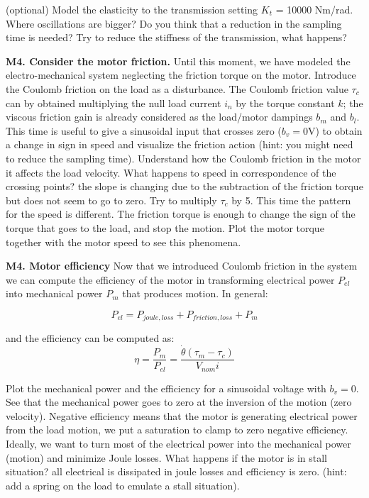 \documentclass[11pt]{article}
\begin{document}
(optional) Model the  elasticity to the transmission setting $K_t$ = 10000 Nm/rad. Where oscillations are bigger? Do you think that a reduction in the sampling time is needed? Try to reduce the stiffness of the transmission, what happens?
%
%
\par
\textbf{M4. Consider the motor friction.} 
Until this moment, we have modeled the electro-mechanical system neglecting the friction torque on the motor. 
Introduce the Coulomb friction on the load as a disturbance. 
The Coulomb friction value $\tau_c$ can by obtained multiplying the null load current $i_n$ by the torque constant $k$; the viscous friction gain is already considered as the load/motor dampings $b_m$ and $b_l$. This time is useful to give a sinusoidal input that crosses zero ($b_v = 0 \mathrm{V}$)
to obtain a  change in sign in speed  and visualize the friction action (hint: you might need to reduce the sampling time). Understand how the Coulomb friction in the motor it affects the load velocity. 
What happens to speed in correspondence of the crossing points? the slope  is 
changing due to the subtraction of the friction torque but does not seem to go to zero. 
Try to multiply $\tau_c$ by 5. This time the pattern for the speed is different. 
The friction torque is enough to change the sign of the torque that goes to the load, 
and stop the motion. Plot the motor torque together with the motor speed to see this phenomena.


\textbf{M4. Motor efficiency}
Now that we introduced Coulomb friction in the system we can compute the efficiency of the motor in 
transforming electrical power $P_{el}$  into mechanical power $P_m$ that produces motion. 
In general:

\begin{equation}
P_{el} = P_{joule,loss} + P_{friction, loss} +   P_m
\end{equation}

and the efficiency can be computed as:
\begin{equation}
\eta = \frac{P_{m}}{P_{el}} =  \frac{\dot{\theta}(\tau_m - \tau_c)} {V_{nom} i }
\end{equation}

Plot the mechanical power and the efficiency for a sinusoidal voltage with $b_v = 0$. 
See that the mechanical power goes to zero at the inversion of the motion (zero velocity).
Negative efficiency means that the motor is generating electrical power from the load motion, 
we put a saturation to clamp to zero negative efficiency.
Ideally, we want to turn most of the electrical power into the mechanical power (motion) and minimize Joule losses. 
What happens if the motor is in stall situation? all electrical is dissipated in joule losses and efficiency is zero. 
(hint: add a spring on the load to emulate a stall situation).
\end{document}
